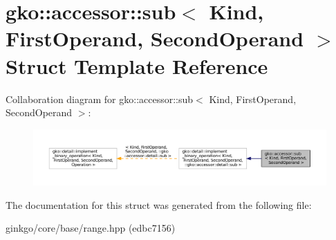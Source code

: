 \hypertarget{structgko_1_1accessor_1_1sub}{}\section{gko\+:\+:accessor\+:\+:sub$<$ Kind, First\+Operand, Second\+Operand $>$ Struct Template Reference}
\label{structgko_1_1accessor_1_1sub}


Collaboration diagram for gko\+:\+:accessor\+:\+:sub$<$ Kind, First\+Operand, Second\+Operand $>$\+:
\nopagebreak
\begin{figure}[H]
\begin{center}
\leavevmode
\includegraphics[width=350pt]{structgko_1_1accessor_1_1sub__coll__graph}
\end{center}
\end{figure}


The documentation for this struct was generated from the following file\+:\begin{DoxyCompactItemize}
\item 
ginkgo/core/base/range.\+hpp (edbc7156)\end{DoxyCompactItemize}
